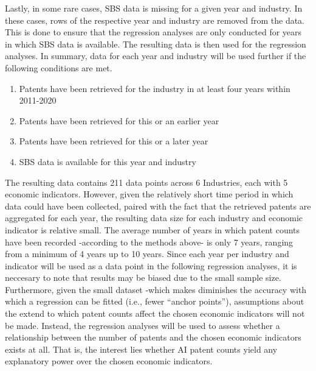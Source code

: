 \documentclass[
  11,
  a4paperpaper,
]{article}
\providecommand{\tightlist}{%
  \setlength{\itemsep}{0pt}\setlength{\parskip}{0pt}}\usepackage{longtable,booktabs,array}
\begin{document}
Lastly, in some rare cases, SBS data is missing for a given year and
industry. In these cases, rows of the respective year and industry are
removed from the data. This is done to ensure that the regression
analyses are only conducted for years in which SBS data is available.
The resulting data is then used for the regression analyses. In summary,
data for each year and industry will be used further if the following
conditions are met.

\begin{enumerate}
\def\labelenumi{\arabic{enumi}.}
\tightlist
\item
  Patents have been retrieved for the industry in at least four years
  within 2011-2020
\item
  Patents have been retrieved for this or an earlier year
\item
  Patents have been retrieved for this or a later year
\item
  SBS data is available for this year and industry
\end{enumerate}

The resulting data contains 211 data points across 6 Industries, each
with 5 economic indicators. However, given the relatively short time
period in which data could have been collected, paired with the fact
that the retrieved patents are aggregated for each year, the resulting
data size for each industry and economic indicator is relative small.
The average number of years in which patent counts have been recorded
-according to the methods above- is only 7 years, ranging from a minimum
of 4 years up to 10 years. Since each year per industry and indicator
will be used as a data point in the following regression analyses, it is
neccesary to note that results may be biased due to the small sample
size. Furthermore, given the small dataset -which makes diminishes the
accuracy with which a regression can be fitted (i.e., fewer ``anchor
points''), assumptions about the extend to which patent counts affect
the chosen economic indicators will not be made. Instead, the regression
analyses will be used to assess whether a relationship between the
number of patents and the chosen economic indicators exists at all. That
is, the interest lies whether AI patent counts yield any explanatory
power over the chosen economic indicators.
\end{document}
